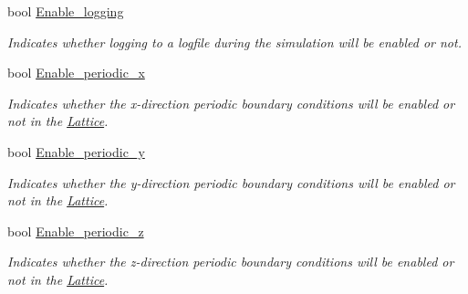 \begin{DoxyCompactItemize}
\item 
\mbox{\label{struct_parameters___simulation_afde5aaac6f3cd226249cb9646a4c8a4b}} 
bool \hyperlink{struct_parameters___simulation_afde5aaac6f3cd226249cb9646a4c8a4b}{Enable\+\_\+logging}
\begin{DoxyCompactList}\small\item\em Indicates whether logging to a logfile during the simulation will be enabled or not. \end{DoxyCompactList}\item 
\mbox{\label{struct_parameters___simulation_a5624782454dd99271ad94923f53866b4}} 
bool \hyperlink{struct_parameters___simulation_a5624782454dd99271ad94923f53866b4}{Enable\+\_\+periodic\+\_\+x}
\begin{DoxyCompactList}\small\item\em Indicates whether the x-\/direction periodic boundary conditions will be enabled or not in the \hyperlink{class_lattice}{Lattice}. \end{DoxyCompactList}\item 
\mbox{\label{struct_parameters___simulation_a1c3d79a4dcf194f884e8a3d346c2261a}} 
bool \hyperlink{struct_parameters___simulation_a1c3d79a4dcf194f884e8a3d346c2261a}{Enable\+\_\+periodic\+\_\+y}
\begin{DoxyCompactList}\small\item\em Indicates whether the y-\/direction periodic boundary conditions will be enabled or not in the \hyperlink{class_lattice}{Lattice}. \end{DoxyCompactList}\item 
\mbox{\label{struct_parameters___simulation_a0d318f1a9eb75fa909b4ae8266696be1}} 
bool \hyperlink{struct_parameters___simulation_a0d318f1a9eb75fa909b4ae8266696be1}{Enable\+\_\+periodic\+\_\+z}
\begin{DoxyCompactList}\small\item\em Indicates whether the z-\/direction periodic boundary conditions will be enabled or not in the \hyperlink{class_lattice}{Lattice}. \end{DoxyCompactList}\item 
\mbox{\label{struct_parameters___simulation_a038f418e1b2e4fec3fc6a8336f8b23de}} 

\end{DoxyCompactItemize}
